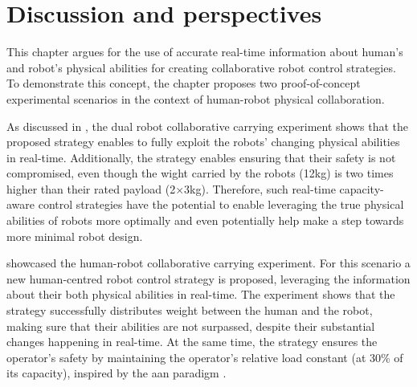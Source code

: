 

\section{Discussion and perspectives}
\label{sec:discussion_perspectives_carrying}
This chapter argues for the use of accurate real-time information about human's and robot's physical abilities for creating collaborative robot control strategies. To demonstrate this concept, the chapter proposes two proof-of-concept experimental scenarios in the context of human-robot physical collaboration. 

As discussed in , the dual robot collaborative carrying experiment shows that the proposed strategy enables to fully exploit the robots' changing physical abilities in real-time. Additionally, the strategy enables ensuring that their safety is not compromised, even though the wight carried by the robots (12kg) is two times higher than their rated payload (2$\times$3kg). Therefore, such real-time capacity-aware control strategies have the potential to enable leveraging the true physical abilities of robots more optimally and even potentially help make a step towards more minimal robot design.

 showcased the human-robot collaborative carrying experiment. For this scenario a new human-centred robot control strategy is proposed, leveraging the information about their both physical abilities in real-time. The experiment shows that the strategy successfully distributes weight between the human and the robot, making sure that their abilities are not surpassed, despite their substantial changes happening in real-time. At the same time, the strategy ensures the operator's safety by maintaining the operator's relative load constant (at 30\% of its capacity), inspired by the \gls{aan} paradigm \cite{carmichael2013admittance}.


